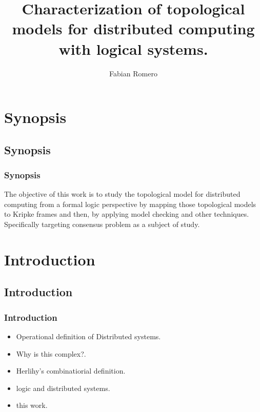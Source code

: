 \documentclass[hyperref={pdfpagelabels=false}]{beamer}
\title{ Characterization of topological models for distributed computing with logical systems. }
\author{Fabian Romero}
\date{}
\begin{document}

\begin{frame}
\titlepage
\end{frame} 
 
\section{Synopsis} 
\subsection{Synopsis} 
\begin{frame}
\frametitle{Synopsis}
The objective of this work is to study the topological model for distributed computing from a formal logic perspective by mapping those topological models to Kripke frames and then, by applying model checking and other techniques. Specifically targeting consensus problem as a subject of study.
\end{frame}

\section{Introduction} 
\subsection{Introduction} 
\begin{frame}
\frametitle{Introduction}
  \begin{itemize}[<+->]
  \item Operational definition of Distributed systems.
  \item Why is this complex?.
  \item Herlihy's combinatiorial definition.
  \item logic and distributed systems.
  \item this work.
  \end{itemize}
\end{frame}
\end{document}
